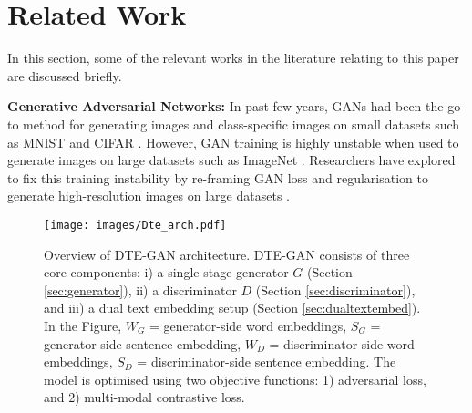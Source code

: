 \section{Related Work}
In this section, some of the relevant works in the literature relating to this paper are discussed briefly.

\noindent\textbf{Generative Adversarial Networks:}  In past few years, GANs \citep{GAN_2014} had been the go-to method for generating images and class-specific images \citep{condtionalgan,acgan,cgans_projections} on small datasets such as MNIST \citep{MNIST} and CIFAR \citep{cifar}. However, GAN training is highly unstable when used to generate images on large datasets such as ImageNet \citep{imagenet}. Researchers have explored to fix this training instability by re-framing  GAN loss and regularisation \citep{wgan,I_wgan,lsgan,sn_gan,orthogonal_regularisation} to generate high-resolution images on large datasets \citep{progressive_gan,big_gan}. 

\begin{figure*}[t]
    \centering
    \texttt{[image: images/Dte\_arch.pdf]}
    \vspace{-0.2cm}
    \caption{Overview of DTE-GAN architecture. DTE-GAN consists of three core components: i) a single-stage generator $G$ (Section \ref{sec:generator}), ii) a discriminator $D$ (Section \ref{sec:discriminator}), and iii) a dual text embedding setup (Section \ref{sec:dualtextembed}). In the Figure, $W_G$ = generator-side word embeddings, $S_G$ = generator-side sentence embedding, $W_D$ = discriminator-side word embeddings, $S_D$ = discriminator-side sentence embedding. The model is optimised using two objective functions: 1) adversarial loss, and 2) multi-modal contrastive loss.}
    \label{fig:modelarch}
\end{figure*}

